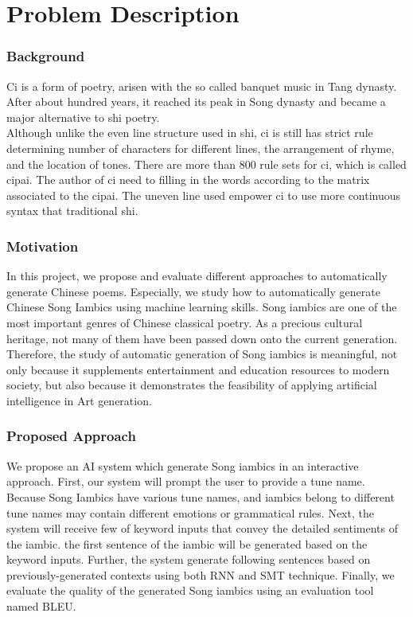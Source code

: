 \section{Problem Description}
\subsubsection{Background}
Ci is a form of poetry, arisen with the so called banquet music in Tang dynasty. After about hundred years, it reached its peak in Song dynasty and became a major alternative to shi poetry\cite{cai2008chinesepoetry}.\\

Although unlike the even line structure used in shi, ci is still has strict rule determining number of characters for different lines, the arrangement of rhyme, and the location of tones. There are more than 800 rule sets for ci, which is called cipai\cite{wikici}. The author of ci need to filling in the words according to the matrix associated to the cipai. The uneven line used empower ci to use more continuous syntax that traditional shi\cite{cai2008chinesepoetry}.
\subsubsection{Motivation}
In this project, we propose and evaluate different approaches to automatically generate Chinese poems. 
%
Especially, we study how to automatically generate Chinese Song Iambics using machine learning skills.
%
Song iambics are one of the most important genres of Chinese classical poetry. 
%
As a precious cultural heritage, not many of them have been passed down onto the current generation.
%
Therefore, the study of automatic generation of Song iambics is meaningful, not only because it supplements entertainment and education resources to modern society, but also because it demonstrates the feasibility of applying artificial intelligence in Art generation. 
%
\subsubsection{Proposed Approach}
We propose an AI system which generate Song iambics in an interactive approach.
%
First, our system will prompt the user to provide a tune name.
%
Because Song Iambics have various tune names, and iambics belong to different tune names may contain different emotions or grammatical rules.
%
Next, the system will receive few of keyword inputs that convey the detailed sentiments of the iambic.
%
the first sentence of the iambic will be generated based on the keyword inputs.
%
Further, the system generate following sentences based on previously-generated contexts using both RNN and SMT technique.
%
Finally, we evaluate the quality of the generated Song iambics using an evaluation tool named BLEU.

